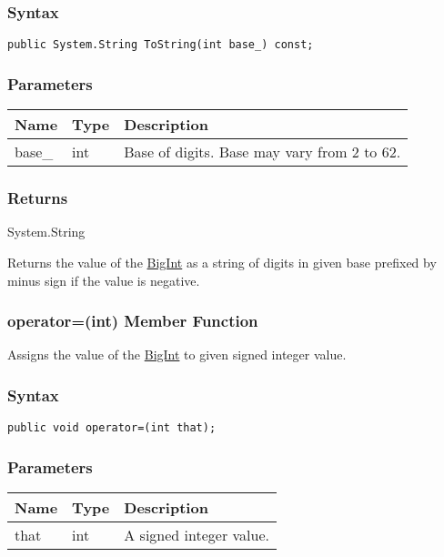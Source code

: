 \documentclass[a4paper,oneside,11.000000pt]{book}
\begin{document}
\subsubsection*{Syntax}
\texttt{public System.String ToString(int base\_) const;}
\subsubsection*{Parameters}
\begin{flushleft}
\begin{supertabular}[l]{lll}
\textbf{Name}
& \textbf{Type}
& \textbf{Description}
\\
\hline
base\_
& int
& Base of digits. Base may vary from 2 to 62.

\\
\end{supertabular}

\end{flushleft}
\subsubsection*{Returns}System.\-String
\begin{flushleft}
Returns the value of the \hyperlink{System.Numerics.Multiprecision.BigInt}{BigInt} as a string of digits in given base prefixed by minus sign if the value is negative.

\end{flushleft}
\clearpage

\hypertarget{System.Numerics.Multiprecision.BigInt.operator.assign.P.System.Numerics.Multiprecision.BigInt.int}{\subsubsection*{operator=(int) Member Function}}
\begin{flushleft}
Assigns the value of the \hyperlink{System.Numerics.Multiprecision.BigInt}{BigInt} to given signed integer value.

\end{flushleft}
\subsubsection*{Syntax}\texttt{public void operator=(int that);}

\subsubsection*{Parameters}
\begin{flushleft}
\begin{supertabular}[l]{lll}
\textbf{Name}
& \textbf{Type}
& \textbf{Description}
\\
\hline
that
& int
& A signed integer value.

\\
\end{supertabular}

\end{flushleft}
\clearpage
\end{document}
